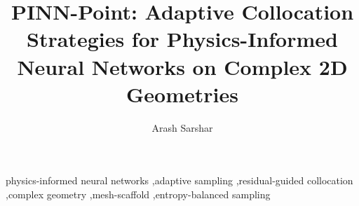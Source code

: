 \documentclass[preprint,12pt]{elsarticle}
\theoremstyle{remark}
\newcommand{\pinnpoint}{PINN-Point\xspace}
\newif\ifblindsubmission
\begin{document}
\begin{frontmatter}

\title{\pinnpoint: Adaptive Collocation Strategies for Physics-Informed Neural Networks on Complex 2D Geometries}

\ifblindsubmission
\author{Anonymous Author(s)}
\address{Anonymous Institution}
\else
\author[inst1]{Arash Sarshar}
\address[inst1]{Department of Computer Engineering and Computer Science, California State University, Long Beach, 90840, CA, USA}
\fi



\begin{keyword}
physics-informed neural networks \sep adaptive sampling \sep residual-guided collocation \sep complex geometry \sep mesh-scaffold \sep entropy-balanced sampling
\end{keyword}

\end{frontmatter}







\ifblindsubmission
\else

\fi

\end{document}
